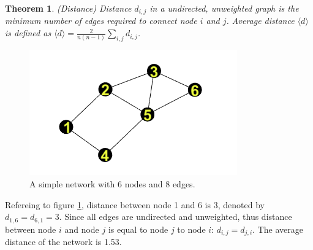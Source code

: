 \documentclass[12pt]{article}
\newtheorem{theorem}{Theorem}[section]
\begin{document}
\begin{theorem}{(Distance)}
    Distance $d_{i,j}$ in a undirected, unweighted graph is the minimum number of edges required to connect node $i$ and $j$. Average distance $\langle d\rangle$ is defined as $\langle d \rangle = \frac{2}{n(n-1)}\sum_{i,j}d_{i,j}$.
\end{theorem}
\begin{figure}[!h]
    \includegraphics[width=0.8\textwidth]{simplenetwork.png}
    \caption{A simple network with 6 nodes and 8 edges.}
    \label{fig:simple_network}
\end{figure}
Refereing to figure \ref{fig:simple_network}, distance between node 1 and 6 is 3, denoted by $d_{1,6}=d_{6,1}=3$. Since all edges are undirected and unweighted, thus distance between node $i$ and node $j$ is equal to node $j$ to node $i$: $d_{i,j}=d_{j,i}$. The average distance of the network is 1.53.\\
\end{document}
